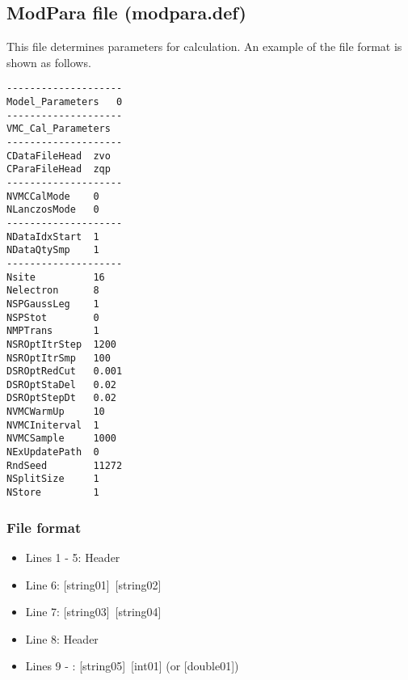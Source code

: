 \subsection{ModPara file (modpara.def)}
\label{Subsec:modpara}
This file determines parameters for calculation. An example of the file format is shown as follows.\\
\begin{minipage}{10cm}
\begin{screen}
\begin{verbatim}
--------------------
Model_Parameters   0
--------------------
VMC_Cal_Parameters
--------------------
CDataFileHead  zvo
CParaFileHead  zqp
--------------------
NVMCCalMode    0
NLanczosMode   0
--------------------
NDataIdxStart  1
NDataQtySmp    1
--------------------
Nsite          16
Nelectron      8
NSPGaussLeg    1
NSPStot        0
NMPTrans       1
NSROptItrStep  1200
NSROptItrSmp   100
DSROptRedCut   0.001
DSROptStaDel   0.02
DSROptStepDt   0.02
NVMCWarmUp     10
NVMCIniterval  1
NVMCSample     1000
NExUpdatePath  0
RndSeed        11272
NSplitSize     1
NStore         1  
\end{verbatim}
\end{screen}
\end{minipage}

\subsubsection{File format}
 \begin{itemize}
   \item  Lines 1 - 5:  Header
   \item  Line 6:  [string01]~[string02]
   \item  Line 7:  [string03]~[string04]
   \item  Line 8:  Header
   \item  Lines 9 - : [string05]~[int01] (or [double01])
  \end{itemize}

